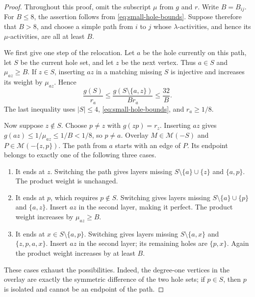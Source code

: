 \documentclass[11pt]{article}
\theoremstyle{definition}
\theoremstyle{remark}
\numberwithin{equation}{section}
\begin{document}
\begin{proof}
Throughout this proof, omit the subscript $\mu$ from $g$ and $r$.
Write $B=B_{ij}$.  For $B\le8$, the assertion follows from
\eqref{eq:small-hole-bounds}.  Suppose therefore that $B>8$, and choose
a simple path from $i$ to $j$ whose $\lambda$-activities, and hence its
$\mu$-activities, are all at least $B$.

We first give one step of the relocation.  Let $a$ be the hole currently
on this path, let $S$ be the current hole set, and let $z$ be the next
vertex.  Thus $a\in S$ and $\mu_{az}\ge B$.
If $z\in S$, inserting $az$ in a matching missing $S$ is injective and
increases its weight by $\mu_{az}$.  Hence
\begin{equation}
\label{eq:adjacent-hole-fill}
 \frac{g(S)}{r_a}\le
 \frac{g(S\setminus\{a,z\})}{B r_a}\le\frac{32}{B}.
\end{equation}
The last inequality uses $|S|\le4$, \eqref{eq:small-hole-bounds}, and
$r_a\ge1/8$.

Now suppose $z\notin S$.  Choose $p\ne z$ with $g(zp)=r_z$.
Inserting $az$ gives $g(az)\le1/\mu_{az}\le1/B<1/8$, so $p\ne a$.
Overlay $M\in\mathcal M(-S)$ and $P\in\mathcal M(-\{z,p\})$.
The path from $a$ starts with an edge of $P$.  Its endpoint belongs to
exactly one of the following three cases.
\begin{enumerate}[label=\textup{(\roman*)},leftmargin=*]
\item It ends at $z$.  Switching the path gives layers missing
$S\setminus\{a\}\cup\{z\}$ and $\{a,p\}$.
The product weight is unchanged.
\item It ends at $p$, which requires $p\notin S$.
Switching gives layers missing $S\setminus\{a\}\cup\{p\}$ and
$\{a,z\}$.  Insert $az$ in the second layer, making it perfect.
The product weight increases by $\mu_{az}\ge B$.
\item It ends at $x\in S\setminus\{a,p\}$.
Switching gives layers missing $S\setminus\{a,x\}$ and
$\{z,p,a,x\}$.  Insert $az$ in the second layer; its remaining holes
are $\{p,x\}$.  Again the product weight increases by at least $B$.
\end{enumerate}
These cases exhaust the possibilities.  Indeed, the degree-one
vertices in the overlay are exactly the symmetric difference of the
two hole sets; if $p\in S$, then $p$ is isolated and cannot be an
endpoint of the path.


\end{proof}
\end{document}
